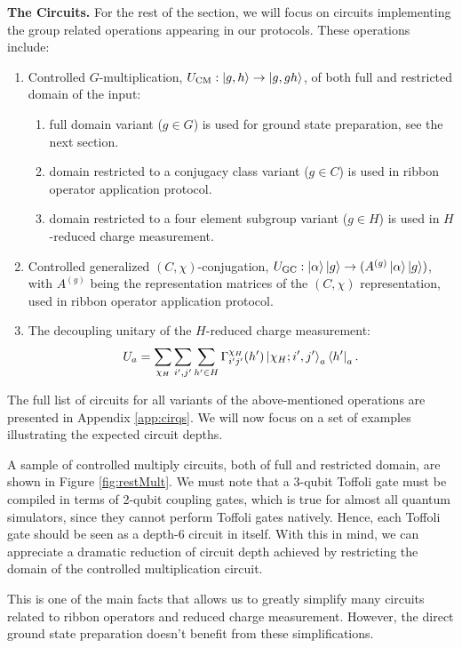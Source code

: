 \documentclass[two column]{article}
\begin{document}
\textbf{The Circuits.} For the rest of the section, we will focus on circuits implementing the group related operations appearing in our protocols. These operations include:\begin{enumerate}
    \item Controlled $G$-multiplication, $U_{\text{CM}}: \ket{g, h} \rightarrow \ket{g, gh}$, of both full and restricted domain of the input:\begin{enumerate}
        \item full domain variant ($g \in G$) is used for ground state preparation, see the next section.
        \item domain restricted to a conjugacy class variant ($g \in C$) is used in ribbon operator application protocol.
        \item domain restricted to a four element subgroup variant ($g \in H$) is used in $H$-reduced charge measurement. 
    \end{enumerate}
    \item Controlled generalized $(C, \chi)$-conjugation, $U_{\text{GC}}: \ket{\alpha}\ket{g} \rightarrow (A^{(g)}\ket{\alpha}\ket{g})$, with $A^{(g)}$ being the representation matrices of the $(C, \chi)$ representation, used in ribbon operator application protocol.
    \item The decoupling unitary of the $H$-reduced charge measurement: $$ U_a = \sum_{\chi_H}\sum_{i', j'}\sum_{h'\in H}  \Gamma^{\chi_H}_{i'j'}(h')  \ket{\chi_H; i', j'}_a\bra{h'}_a. $$
\end{enumerate} 

The full list of circuits for all variants of the above-mentioned operations are presented in Appendix \ref{app:cirqs}.
We will now focus on a set of examples illustrating the expected circuit depths.

A sample of controlled multiply circuits, both of full and restricted domain, are shown in Figure \ref{fig:restMult}. We must note that a 3-qubit Toffoli gate must be compiled in terms of 2-qubit coupling gates, which is true for almost all quantum simulators, since they cannot perform Toffoli gates natively. Hence, each Toffoli gate should be seen as a depth-6 circuit in itself. With this in mind, we can appreciate a dramatic reduction of circuit depth achieved by restricting the domain of the controlled multiplication circuit.

This is one of the main facts that allows us to greatly simplify many circuits related to ribbon operators and reduced charge measurement. However, the direct ground state preparation doesn't benefit from these simplifications.
\end{document}
